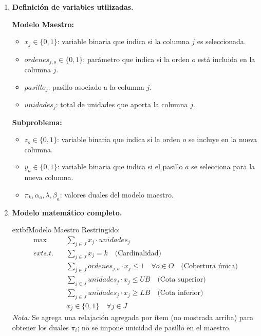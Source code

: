 \documentclass[a4paper,12pt]{article}
\begin{document}
\begin{enumerate}[label=(\alph*), leftmargin=2em]
\begin{enumerate}[label=\roman*., leftmargin=0.2em]
        \item \textbf{Definición de variables utilizadas.}

            \textbf{Modelo Maestro:}
            \begin{itemize}
                \item $x_j \in \{0,1\}$: variable binaria que indica si la columna $j$ es seleccionada.
                \item $ordenes_{j,o} \in \{0,1\}$: parámetro que indica si la orden $o$ está incluida en la columna $j$.
                \item $pasillo_j$: pasillo asociado a la columna $j$.
                \item $unidades_j$: total de unidades que aporta la columna $j$.
            \end{itemize}

            \textbf{Subproblema:}
            \begin{itemize}
                \item $z_o \in \{0,1\}$: variable binaria que indica si la orden $o$ se incluye en la nueva columna.
                \item $y_a \in \{0,1\}$: variable binaria que indica si el pasillo $a$ se selecciona para la nueva columna.
                \item $\pi_k, \alpha_o, \lambda, \beta_a$: valores duales del modelo maestro.
            \end{itemize}

        \item \textbf{Modelo matemático completo.}

            	extbf{Modelo Maestro Restringido:}
            \[
            \begin{aligned}
            \max \quad & \sum_{j \in J} x_j \cdot unidades_j \\
            	ext{s.t.} \quad & \sum_{j \in J} x_j = k \quad \text{(Cardinalidad)} \\
            & \sum_{j \in J} ordenes_{j,o} \cdot x_j \leq 1 \quad \forall o \in O \quad \text{(Cobertura única)} \\
            & \sum_{j \in J} unidades_j \cdot x_j \leq UB \quad \text{(Cota superior)} \\
            & \sum_{j \in J} unidades_j \cdot x_j \geq LB \quad \text{(Cota inferior)} \\
            & x_j \in \{0,1\} \quad \forall j \in J
            \end{aligned}
            \]
            \emph{Nota:} Se agrega una relajación agregada por ítem (no mostrada arriba) para obtener los duales $\pi_i$; no se impone unicidad de pasillo en el maestro.


\end{enumerate}
\end{enumerate}
\end{document}
